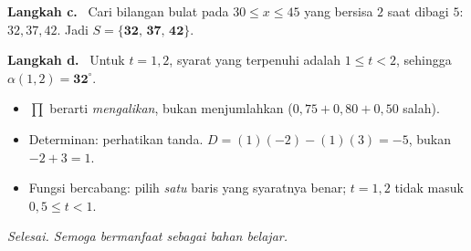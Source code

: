 \documentclass[11pt,a4paper]{article}
\newcommand{\langkah}[1]{\par\smallskip\noindent\textbf{\textcolor{biru}{Langkah #1.}}\ }
\begin{document}
\langkah{c} Cari bilangan bulat pada $30\le x\le45$ yang bersisa $2$ saat dibagi $5$:
$32,37,42$. Jadi $S=\textbf{\{32, 37, 42\}}$.

\langkah{d} Untuk $t=1{,}2$, syarat yang terpenuhi adalah $1\le t<2$, sehingga
$\alpha(1{,}2)=\textbf{32}^\circ$.

\begin{jebakan}
\begin{itemize}[leftmargin=*,topsep=2pt]
  \item $\prod$ berarti \emph{mengalikan}, bukan menjumlahkan
  ($0{,}75+0{,}80+0{,}50$ salah).
  \item Determinan: perhatikan tanda. $D=(1)(-2)-(1)(3)=-5$, bukan $-2+3=1$.
  \item Fungsi bercabang: pilih \emph{satu} baris yang syaratnya benar; $t=1{,}2$
  tidak masuk $0{,}5\le t<1$.
\end{itemize}
\end{jebakan}

\vfill
\begin{center}\small\itshape
Selesai. Semoga bermanfaat sebagai bahan belajar.
\end{center}
\end{document}

